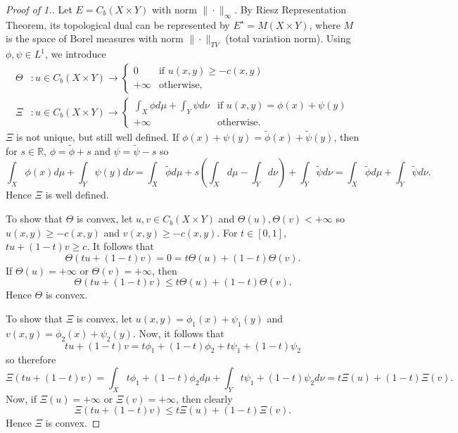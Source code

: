 \documentclass[12pt]{article}
\newcommand{\R}{\mathbb{R}}
\theoremstyle{plain}
\numberwithin{equation}{section}
\begin{document}
\begin{proof}[Proof of 1.]
  Let $E = C_b(X\times Y)$ with norm $\|\cdot\|_\infty$. By Riesz Representation Theorem, its topological dual can be represented by 
  $E^\star = M(X\times Y)$, where $M$ is the space of Borel measures with norm $\|\cdot\|_{TV}$ (total variation norm). Using $\phi,\psi\in L^1$, we introduce 
  \begin{align}
    \Theta &: u\in C_b(X\times Y)\to \begin{cases}
      0 &\text{if } u(x,y)\ge -c(x,y) \\
      +\infty &\text{otherwise,}
    \end{cases} \\
    \Xi &: u\in C_b(X\times Y)\to \begin{cases}
      \int_X \phi d\mu + \int_Y \psi d\nu &\text{if }u(x,y) = \phi(x) + \psi(y)\\
      +\infty&\text{otherwise.}
    \end{cases}
  \end{align}
$\Xi$ is not unique, but still well defined. If $\phi(x) + \psi(y) = \tilde{\phi}(x) + \tilde{\psi}(y)$, then for $s\in\R$, $\phi = \tilde{\phi} + s$ and $\psi = \tilde{\psi} -s$ so \[ \int_X \phi(x)d\mu + \int_Y \psi(y)d\nu = \int_X \tilde{\phi} d\mu + s\left(\int_Xd\mu - \int_Yd\nu\right) + \int_Y\tilde{\psi}d\nu = \int_X \tilde{\phi} d\mu + \int_Y\tilde{\psi}d\nu.\]
Hence $\Xi$ is well defined.

To show that $\Theta$ is convex, let $u,v\in C_b(X\times Y)$ and $\Theta(u),\Theta(v) < +\infty$ so $u(x,y) \ge -c(x,y)$ and $v(x,y) \ge -c(x,y)$. For $t\in [0,1]$, 
\(tu + (1-t)v \ge c.\) It follows that 
\[\Theta(tu + (1-t)v) = 0 = t\Theta(u) + (1-t)\Theta(v).\]
If $\Theta(u) = +\infty$ or $\Theta(v) = +\infty$, then 
\[\Theta(tu + (1-t)v) \le t\Theta(u) + (1-t)\Theta(v).\]
Hence $\Theta$ is convex.

To show that $\Xi$ is convex, let $u(x,y) = \phi_1(x) + \psi_1(y)$ and $v(x,y) = \phi_2(x) + \psi_2(y)$. Now, it follows that 
\[tu + (1-t)v = t\phi_1 + (1-t)\phi_2 + t\psi_1 + (1-t)\psi_2\]
so therefore
\[\Xi(tu + (1-t)v) = \int_{X}t\phi_1 + (1-t)\phi_2d\mu + \int_{Y}t\psi_1 + (1-t)\psi_2d\nu = t\Xi(u) + (1-t)\Xi(v).\]
Now, if $\Xi(u) = +\infty$ or $\Xi(v) = +\infty$, then clearly 
\[\Xi(tu + (1-t)v) \le t\Xi(u) + (1-t)\Xi(v).\]
Hence $\Xi$ is convex.


\end{proof}
\end{document}
